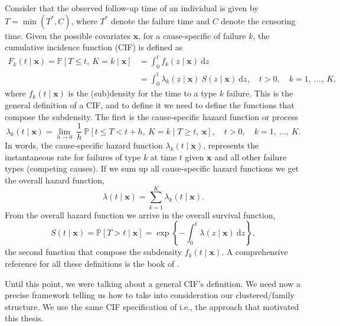 Consider that the observed follow-up time of an individual is given by
\(T = \min(T^{\ast},C)\), where \(T^{\ast}\) denote the failure time
and \(C\) denote the censoring time. Given the possible covariates
\(\bm{x}\), for a cause-specific of failure \(k\), the cumulative
incidence function (CIF) is defined as
\begin{align*}
 F_{k}(t \mid \bm{x})
 = \mathbb{P}[T \leq t,~K = k \mid \bm{x}]
 &= \int_{0}^{t} f_{k}(z \mid \bm{x})~\text{d}z\\
 &= \int_{0}^{t} \lambda_{k}(z \mid \bm{x})~S(z \mid \bm{x})
  ~\text{d}z, \quad t > 0, \quad k = 1,~\dots,~K,
\end{align*}
where \(f_{k}(t \mid \bm{x})\) is the (sub)density for the time to a
type \(k\) failure. This is the general definition of a CIF, and to
define it we need to define the functions that compose the subdensity.
The first is the cause-specific hazard function or process
\[
 \lambda_{k}(t \mid \bm{x}) = \lim_{h \rightarrow 0}~\frac{1}{h}~
 \mathbb{P}[t \leq T < t + h,~K = k \mid T \geq t,~\bm{x}],
 \quad t > 0, \quad k = 1,~\dots,~K.
\]
In words, the cause-specific hazard function \(\lambda_{k}(t \mid
\bm{x})\), represents the instantaneous rate for failures of type
\(k\) at time \(t\) given \(\bm{x}\) and all other failure types
(competing causes). If we sum up all cause-specific hazard functions we
get the overall hazard function,
\[
 \lambda(t \mid \bm{x}) = \sum_{k=1}^{K}\lambda_{k}(t \mid \bm{x}).
\]
From the overall hazard function we arrive in the overall survival
function,
\[
 S(t \mid \bm{x}) = \mathbb{P}[T > t \mid \bm{x}] =
 \exp\left\{-\int_{0}^{t} \lambda(z \mid \bm{x})~\text{d}z\right\},
\]
the second function that compose the subdensity \(f_{k}(t \mid
\bm{x})\). A comprehensive reference for all these definitions is
the book of .

Until this point, we were talking about a general CIF's definition. We
need now a precise framework telling us how to take into consideration
our clustered/family structure. We use the same CIF specification of
 i.e., the approach that motivated this thesis.

